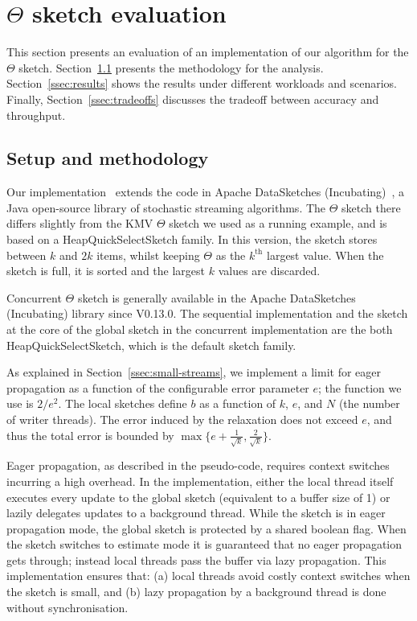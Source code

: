 \section{$\Theta$ sketch evaluation}
\label{sec:eval}

This section presents an evaluation of an implementation of our algorithm for the $\Theta$ sketch.
Section~\ref{ssec:setup-and-methodology} presents the methodology for the analysis.
Section~\ref{ssec:results} shows the results under different
workloads and scenarios. Finally, Section~\ref{ssec:tradeoffs} discusses the tradeoff between
accuracy and throughput.

\subsection{Setup and methodology}
\label{ssec:setup-and-methodology}

Our implementation~\cite{ConcurrentThetaImp} extends the code in Apache DataSketches (Incubating)~\cite{DataSketches}, a Java
open-source library of stochastic streaming algorithms. The $\Theta$ sketch there differs slightly
from the KMV $\Theta$ sketch we used as a running example, and is based on a HeapQuickSelectSketch family.
In this version, the sketch stores between $k$ and $2k$ items, whilst keeping $\Theta$ as the $k^{\text{th}}$
largest value. When the sketch is full, it is sorted and the largest $k$ values are discarded.

Concurrent $\Theta$ sketch is generally available in the Apache DataSketches (Incubating)
library since V0.13.0. The sequential implementation and the sketch at the core of the global sketch
in the concurrent implementation are the both \\ HeapQuickSelectSketch, which is the default sketch family.

As explained in Section~\ref{ssec:small-streams}, we implement a limit for eager propagation as a function
of the configurable error parameter $e$; the function we use is $2 / e^2$. The local sketches define $b$
as a function of $k$, $e$, and $N$ (the number of writer threads). The error induced by the relaxation
does not exceed $e$, and thus the total error is bounded by $\max\{e + \frac{1}{\sqrt{k}}, \frac{2}{\sqrt{k}}\}$.

Eager propagation, as described in the pseudo-code, requires context switches incurring a high overhead. In the
implementation, either the local thread itself executes every update to the global sketch (equivalent to a
buffer size of 1) or lazily delegates updates to a background thread. While the sketch is in eager propagation
mode, the global sketch is protected by a shared boolean flag. When the sketch switches to estimate mode it
is guaranteed that no eager propagation gets through; instead local threads pass the buffer via lazy propagation.
This implementation ensures that: (a) local threads avoid costly context switches when the sketch is small, and (b)
lazy propagation by a background thread is done without synchronisation.

